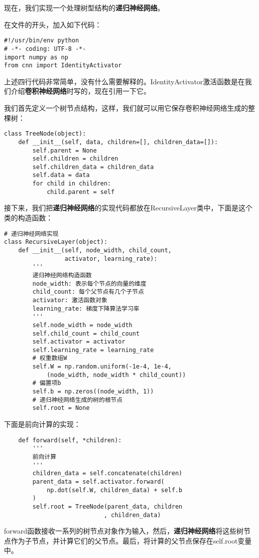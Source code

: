 现在，我们实现一个处理树型结构的\textbf{递归神经网络}。

在文件的开头，加入如下代码：
\begin{lstlisting}
#!/usr/bin/env python
# -*- coding: UTF-8 -*-
import numpy as np
from cnn import IdentityActivator
\end{lstlisting}


上述四行代码非常简单，没有什么需要解释的。IdentityActivator激活函数是在我们介绍\textbf{卷积神经网络}时写的，现在引用一下它。

我们首先定义一个树节点结构，这样，我们就可以用它保存卷积神经网络生成的整棵树：
\begin{lstlisting}
class TreeNode(object):
    def __init__(self, data, children=[], children_data=[]):
        self.parent = None
        self.children = children
        self.children_data = children_data
        self.data = data
        for child in children:
            child.parent = self
\end{lstlisting}


接下来，我们把\textbf{递归神经网络}的实现代码都放在RecursiveLayer类中，下面是这个类的构造函数：
\begin{lstlisting}
# 递归神经网络实现
class RecursiveLayer(object):
    def __init__(self, node_width, child_count, 
                 activator, learning_rate):
        '''
        递归神经网络构造函数
        node_width: 表示每个节点的向量的维度
        child_count: 每个父节点有几个子节点
        activator: 激活函数对象
        learning_rate: 梯度下降算法学习率
        '''
        self.node_width = node_width
        self.child_count = child_count
        self.activator = activator
        self.learning_rate = learning_rate
        # 权重数组W
        self.W = np.random.uniform(-1e-4, 1e-4,
            (node_width, node_width * child_count))
        # 偏置项b
        self.b = np.zeros((node_width, 1))
        # 递归神经网络生成的树的根节点
        self.root = None
\end{lstlisting}


下面是前向计算的实现：
\begin{lstlisting}
    def forward(self, *children):
        '''
        前向计算
        '''
        children_data = self.concatenate(children)
        parent_data = self.activator.forward(
            np.dot(self.W, children_data) + self.b
        )
        self.root = TreeNode(parent_data, children
                            , children_data)
\end{lstlisting}


forward函数接收一系列的树节点对象作为输入，然后，\textbf{递归神经网络}将这些树节点作为子节点，并计算它们的父节点。最后，将计算的父节点保存在self.root变量中。

